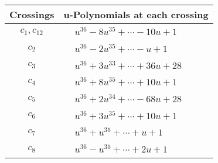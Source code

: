 \documentclass[1p]{elsarticle_modified}
\theoremstyle{definition}
\begin{document}
\begin{tabular}{m{50pt}|m{274pt}}
Crossings & \hspace{64pt}u-Polynomials at each crossing \\
\hline $$\begin{aligned}c_{1},c_{12}\end{aligned}$$&$\begin{aligned}
&u^{36}-8 u^{35}+\cdots-10 u+1
\end{aligned}$\\
\hline $$\begin{aligned}c_{2}\end{aligned}$$&$\begin{aligned}
&u^{36}-2 u^{35}+\cdots- u+1
\end{aligned}$\\
\hline $$\begin{aligned}c_{3}\end{aligned}$$&$\begin{aligned}
&u^{36}+3 u^{33}+\cdots+36 u+28
\end{aligned}$\\
\hline $$\begin{aligned}c_{4}\end{aligned}$$&$\begin{aligned}
&u^{36}+8 u^{35}+\cdots+10 u+1
\end{aligned}$\\
\hline $$\begin{aligned}c_{5}\end{aligned}$$&$\begin{aligned}
&u^{36}+2 u^{34}+\cdots-68 u+28
\end{aligned}$\\
\hline $$\begin{aligned}c_{6}\end{aligned}$$&$\begin{aligned}
&u^{36}+3 u^{35}+\cdots+10 u+1
\end{aligned}$\\
\hline $$\begin{aligned}c_{7}\end{aligned}$$&$\begin{aligned}
&u^{36}+u^{35}+\cdots+u+1
\end{aligned}$\\
\hline $$\begin{aligned}c_{8}\end{aligned}$$&$\begin{aligned}
&u^{36}- u^{35}+\cdots+2 u+1
\end{aligned}$\\

\end{tabular}
\end{document}
